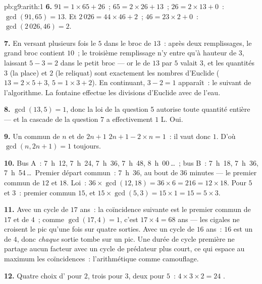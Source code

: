 \begin{solution}{pb:g9:arith:1}
\textbf{6.} $91 = 1 \times 65 + 26$~; $65 = 2 \times 26 + 13$~;
$26 = 2 \times 13 + 0$~: $\gcd(91, 65) = 13$. Et
$2\,026 = 44 \times 46 + 2$~; $46 = 23 \times 2 + 0$~:
$\gcd(2\,026, 46) = 2$.

\textbf{7.} En versant plusieurs fois le $5$ dans le broc de
$13$~: après deux remplissages, le grand broc contient $10$~; le
troisième remplissage n'y entre qu'à hauteur de $3$, laissant
$5 - 3 = 2$ dans le petit broc --- or le  de $13$ par $5$
valait $3$, et les quantités $3$ (la place) et $2$ (le reliquat)
sont exactement les nombres d'Euclide ($13 = 2 \times 5 + 3$,
$5 = 1 \times 3 + 2$). En continuant, $3 - 2 = 1$ apparaît~: le
 suivant de l'algorithme. La fontaine effectue les divisions
d'Euclide avec de l'eau.

\textbf{8.} $\gcd(13, 5) = 1$, donc la loi de la question 5 autorise
toute quantité entière --- et la cascade de la question 7 a
effectivement  $1$ L. Oui.

\textbf{9.} Un  commun de $n$ et de $2n + 1$ 
$2n + 1 - 2 \times n = 1$~: il vaut donc $1$. D'où
$\gcd(n, 2n+1) = 1$ toujours.

\textbf{10.} Bus A~: 7~h~12, 7~h~24, 7~h~36, 7~h~48,
8~h~00\,\dots~; bus B~: 7~h~18, 7~h~36, 7~h~54\,\dots\ Premier
départ commun~: 7~h~36, au bout de $36$ minutes --- le premier
 commun de $12$ et $18$. Loi~:
$36 \times \gcd(12, 18) = 36 \times 6 = 216 = 12 \times 18$. Pour
$5$ et $3$~: premier  commun $15$, et
$15 \times \gcd(5,3) = 15 \times 1 = 15 = 5 \times 3$.

\textbf{11.} Avec un cycle de $17$ ans~: la coïncidence suivante
est le premier  commun de $17$ et de $4$~; comme
$\gcd(17, 4) = 1$, c'est $17 \times 4 = 68$ ans --- les cigales ne
croisent le pic qu'une fois sur quatre sorties. Avec un cycle de
$16$ ans~: $16$ est un  de $4$, donc \emph{chaque} sortie
tombe sur un pic. Une durée de cycle première ne partage aucun
facteur avec un cycle de prédateur plus court, ce qui espace au
maximum les coïncidences~: l'arithmétique comme camouflage.

\textbf{12.} Quatre choix d' pour $2$, trois pour $3$, deux
pour $5$~: $4 \times 3 \times 2 = 24$ .


\end{solution}
